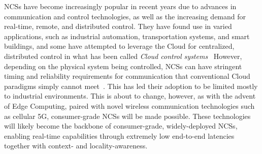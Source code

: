 \glspl{NCS} have become increasingly popular in recent years due to advances in communication and control technologies, as well as the increasing demand for real-time, remote, and distributed control.
They have found use in varied applications, such as industrial automation, transportation systems, and smart buildings, and some have attempted to leverage the Cloud for centralized, distributed control in what has been called \emph{Cloud control systems}~\cite{xia2015cloud}
However, depending on the physical system being controlled, \glspl{NCS} can have stringent timing and reliability requirements for communication that conventional Cloud paradigms simply cannot meet~\cite{wan2020efficient}.
This has led their adoption to be limited mostly to industrial environments.
This is about to change, however, as with the advent of Edge Computing, paired with novel wireless communication technologies such as cellular 5G, consumer-grade \glspl{NCS} will be made possible.
These technologies will likely become the backbone of consumer-grade, widely-deployed \glspl{NCS}, enabling real-time capabilities through extremely low end-to-end latencies together with context- and locality-awareness.
